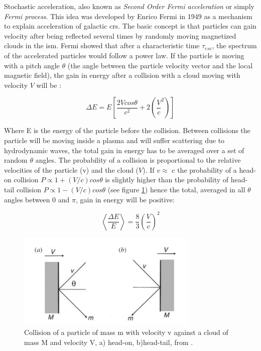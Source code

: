 \documentclass[main.tex]{subfiles}
\begin{document}
Stochastic acceleration, also known as \textit{Second Order Fermi acceleration} or simply \textit{Fermi process}. This idea was developed by Enrico Fermi in 1949 \cite{Fermi:CRorigin} as a mechanism to explain acceleration of galactic \glspl{cr}. The basic concept is that particles can gain velocity after being reflected several times by randomly moving magnetized clouds in the \gls{ism}. Fermi showed that after a characteristic time $\tau_{esc}$, the spectrum of the accelerated particles would follow a power law. If the particle is moving with a pitch angle $\theta$ (the angle between the particle velocity vector and the local magnetic field), the gain in energy after a collision with a cloud moving with velocity $V$ will be \cite{highenergyastrophy}:

\begin{equation}
    \Delta E = E \left[ \frac{2Vcos\theta}{c^2}+2\left(\frac{V}{c}^2\right)\right]
\end{equation}

Where E is the energy of the particle before the collision. Between collisions the particle will be moving inside a plasma and will suffer scattering due to hydrodynamic waves, the total gain in energy has to be averaged over a set of random $\theta$ angles. The probability of a collision is proportional to the relative velocities of the particle (v) and the cloud ($V$). If $v \approx$ c the probability of a head-on collision $P \propto 1+(V/c)cos\theta$ is slightly higher than the probability of head-tail collision $P \propto 1-(V/c)cos\theta$ (see figure \ref{fig:fermiprocess}) hence the total, averaged in all $\theta$ angles between 0 and $\pi$, gain in energy will be positive:

\begin{equation}
    \left< \frac{\Delta E}{E}\right> = \frac{8}{3}\left( \frac{V}{c}\right)^2
\end{equation}

\begin{figure}
    \centering
    \includegraphics[width=0.77\textwidth]{Pictures/secondorderfermiacc.pdf}
    \caption{Collision of a particle of mass m with velocity v against a cloud of mass M and velocity V, a) head-on, b)head-tail, from \cite{highenergyastrophy}.}
    \label{fig:fermiprocess}
\end{figure}
\end{document}
